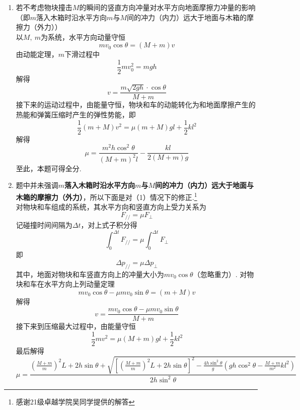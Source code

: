 \begin{solution}
\begin{enumerate}[(1)]
    \item 若不考虑物块撞击$M$的瞬间的竖直方向冲量对水平方向地面摩擦力冲量的影响（即$m$落入木箱时沿水平方向$m$与$M$间的冲力（内力）远大于地面与木箱的摩擦力（外力））\\
    以$M,\ m$为系统，水平方向动量守恒
    $$mv_0\cos\theta=\left(M+m\right)v$$
    由动能定理，$m$下滑过程中
    $$\frac{1}{2}mv_0^2=mgh$$
    解得
    $$v=\frac{m\sqrt{2gh}\cdot\cos\theta}{M+m}$$
    接下来的运动过程中，由能量守恒，物块和车的动能转化为和地面摩擦产生的热能和弹簧压缩时产生的弹性势能，即
    $$\frac{1}{2}\left(m+M\right)v^2=\mu\left(m+M\right)gl+\frac{1}{2}kl^2$$
    解得
    $$\mu=\frac{m^2h\cos^2\theta}{\left(M+m\right)^2l}-\frac{kl}{2\left(M+m\right)g}$$
    至此，本题可得全分.
    \item 题中并未强调\textbf{$m$落入木箱时沿水平方向$m$与$M$间的冲力（内力）远大于地面与木箱的摩擦力（外力）}，所以下面是对（1）情况下的修正.\footnote{感谢21级卓越学院吴同学提供的解答}\\
    对物块和车组成的系统，其水平方向和竖直方向上受力关系为
    $$F_{//}=\mu F_{\perp}$$
    记碰撞时间间隔为$\Delta t$，对上式子积分得
    $$\int_0^{\Delta t}F_{//}=\mu\int_0^{\Delta t} F_{\perp}$$
    即
    $$\Delta p_{//}=\mu\Delta p_{\perp}$$
    其中，地面对物块和车竖直方向上的冲量大小为$mv_0\cos\theta$（忽略重力）.
    对物块和车在水平方向上列动量定理
    $$mv_0\cos\theta-\mu mv_0\sin\theta=\left(m+M\right)v$$
    解得
    $$v=\frac{mv_0\cos\theta-\mu mv_0\sin\theta}{M+m}$$
    接下来到压缩最大过程中，由能量守恒
    $$\frac{1}{2}mv^2=\mu\left(M+m\right)gl+\frac{1}{2}kl^2$$
    最后解得
    $$\mu=\frac{\left(\frac{M+m}{m}\right)^2L+2h\sin\theta+\sqrt{\left[\left(\frac{M+m}{m}\right)^2L+2h\sin\theta \right]^2-\frac{4h\sin^2\theta}{g}\left(gh\cos^2\theta-\frac{M+m}{m^2}kl^2\right)}}{2h\sin^2\theta}$$
\end{enumerate}
\end{solution}